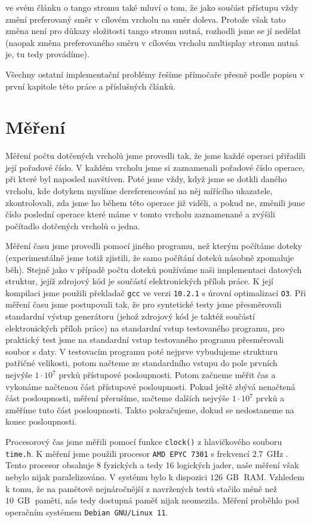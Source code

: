 \citet{tango} ve svém článku o tango stromu také mluví o tom, že jako součást přístupu vždy změní preferovaný směr v cílovém vrcholu na směr doleva. Protože však tato změna není pro důkazy složitosti tango stromu nutná, rozhodli jsme se jí nedělat (naopak změna preferovaného směru v cílovém vrcholu multisplay stromu nutná je, tu tedy provádíme).

Všechny ostatní implementační problémy řešíme přímočaře přesně podle popisu v první kapitole této práce a příslušných článků.

\section{Měření}

Měření počtu dotčených vrcholů jsme provedli tak, že jsme každé operaci 
přiřadili její pořadové číslo. V každém vrcholu jsme si zaznamenali pořadové číslo
operace, při které byl naposled navštíven. Poté jsme vždy, když jsme se dotkli daného
vrcholu, kde dotykem myslíme dereferencování na něj mířícího ukazatele,
zkontrolovali, zda jsme ho během této operace již viděli, a pokud ne, změnili jsme
číslo poslední operace které máme v tomto vrcholu zaznamenané a zvýšili
počítadlo dotčených vrcholů o jedna.

Měření času jsme provedli pomocí jiného programu, než kterým počítáme doteky
(experimentálně jsme totiž zjistili, že samo počítání doteků násobně zpomaluje
běh). Stejně jako v případě počtu doteků používáme naši implementaci datových
struktur, jejíž zdrojový kód je součástí elektronických příloh práce. K její
kompilaci jsme použili překladač {\tt gcc} ve verzi {\tt 10.2.1} s úrovní
optimalizací {\tt O3}. Při měření času jsme postupovali tak, že pro syntetické
testy jsme přesměrovali standardní výstup generátoru (jehož zdrojový kód je
taktéž součástí elektronických příloh práce) na standardní vstup testovaného
programu, pro praktický test jsme na standardní vstup testovaného programu
přesměrovali soubor s daty. V testovacím programu poté nejprve vybudujeme
strukturu patřičné velikosti, potom načteme ze standardního vstupu do pole
prvních nejvýše $1\cdot10^7$ prvků přístupové posloupnosti. Potom začneme měřit
čas a vykonáme načtenou část přístupové posloupnosti. Pokud ještě zbývá
nenačtená část posloupnosti, měření přerušíme, načteme dalších nejvýše
$1\cdot10^7$ prvků a změříme tuto část posloupnosti. Takto pokračujeme, dokud
se nedostaneme na konec posloupnosti.

Procesorový čas jsme měřili pomocí funkce {\tt clock()} z hlavičkového souboru
{\tt time.h}. K měření jsme použili procesor {\tt AMD EPYC 7301} s
frekvencí  $2.7\, \operatorname{GHz}$. Tento procesor obsahuje 8 fyzických a tedy
16 logických jader, naše měření však nebylo nijak paralelizováno. V systému bylo
k dispozici $126\,\operatorname{GB}$ RAM. Vzhledem k tomu, že na pamětově
nejnáročnější z navržených testů stačilo méně než $10\,\operatorname{GB}$
paměti, nás tedy dostupná paměť nijak neomezila. Měření proběhlo pod operačním
systémem {\tt Debian GNU/Linux 11}.


